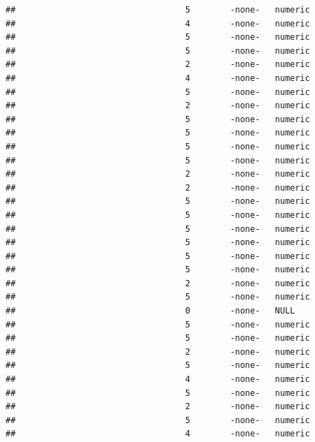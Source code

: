\documentclass[
  12pt,
]{article}
\begin{document}
\begin{verbatim}
##                                  5        -none-   numeric                    
##                                  4        -none-   numeric                    
##                                  5        -none-   numeric                    
##                                  5        -none-   numeric                    
##                                  2        -none-   numeric                    
##                                  4        -none-   numeric                    
##                                  5        -none-   numeric                    
##                                  2        -none-   numeric                    
##                                  5        -none-   numeric                    
##                                  5        -none-   numeric                    
##                                  5        -none-   numeric                    
##                                  5        -none-   numeric                    
##                                  2        -none-   numeric                    
##                                  2        -none-   numeric                    
##                                  5        -none-   numeric                    
##                                  5        -none-   numeric                    
##                                  5        -none-   numeric                    
##                                  5        -none-   numeric                    
##                                  5        -none-   numeric                    
##                                  5        -none-   numeric                    
##                                  2        -none-   numeric                    
##                                  5        -none-   numeric                    
##                                  0        -none-   NULL                       
##                                  5        -none-   numeric                    
##                                  5        -none-   numeric                    
##                                  2        -none-   numeric                    
##                                  5        -none-   numeric                    
##                                  4        -none-   numeric                    
##                                  5        -none-   numeric                    
##                                  2        -none-   numeric                    
##                                  5        -none-   numeric                    
##                                  4        -none-   numeric                    

\end{verbatim}
\end{document}
